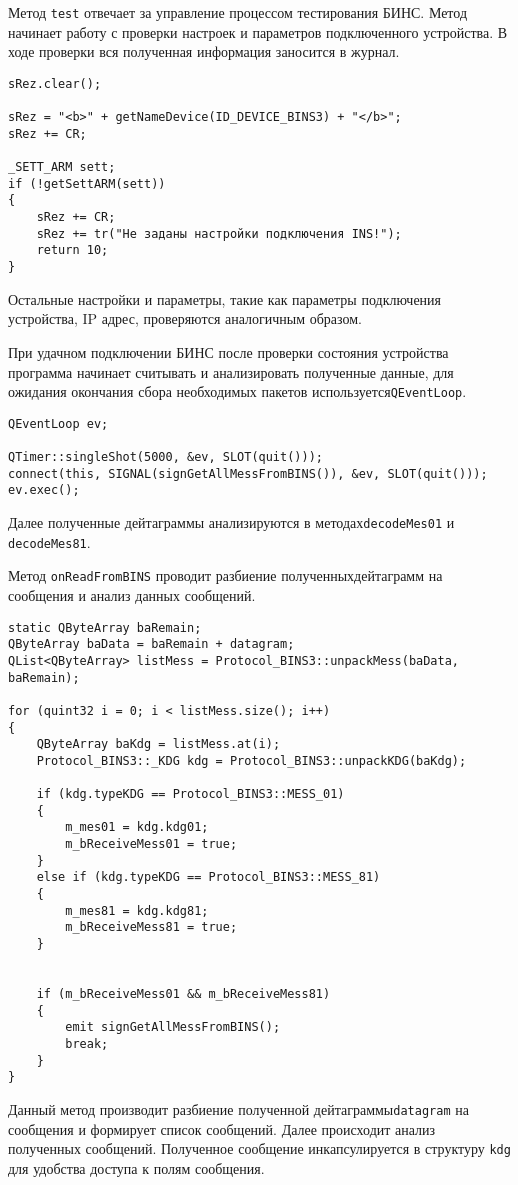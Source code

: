 Метод \texttt{test} отвечает за управление процессом тестирования БИНС. Метод начинает работу с проверки настроек и
параметров подключенного устройства. В ходе проверки вся полученная информация заносится в журнал.
\medskip
\begin{verbatim}
sRez.clear();

sRez = "<b>" + getNameDevice(ID_DEVICE_BINS3) + "</b>";
sRez += CR;

_SETT_ARM sett;
if (!getSettARM(sett))
{
	sRez += CR;
	sRez += tr("Не заданы настройки подключения INS!");
	return 10;
}
\end{verbatim}
\medskip

Остальные настройки и параметры, такие как параметры подключения устройства, IP адрес, проверяются аналогичным образом.

При удачном подключении БИНС после проверки состояния устройства программа начинает считывать и анализировать полученные
данные, для ожидания окончания сбора необходимых пакетов используется\break \texttt{QEventLoop}.
\medskip
\begin{verbatim}
QEventLoop ev;

QTimer::singleShot(5000, &ev, SLOT(quit()));
connect(this, SIGNAL(signGetAllMessFromBINS()), &ev, SLOT(quit()));
ev.exec();
\end{verbatim}
\medskip

Далее полученные дейтаграммы анализируются в методах\break \texttt{decodeMes01} и \texttt{decodeMes81}.

Метод \texttt{onReadFromBINS} проводит разбиение полученных\break дейтаграмм на сообщения и анализ данных сообщений.
\medskip
\begin{verbatim}
static QByteArray baRemain;
QByteArray baData = baRemain + datagram;
QList<QByteArray> listMess = Protocol_BINS3::unpackMess(baData, baRemain);

for (quint32 i = 0; i < listMess.size(); i++)
{
	QByteArray baKdg = listMess.at(i);
	Protocol_BINS3::_KDG kdg = Protocol_BINS3::unpackKDG(baKdg);

	if (kdg.typeKDG == Protocol_BINS3::MESS_01)
	{
		m_mes01 = kdg.kdg01;
		m_bReceiveMess01 = true;
	}
	else if (kdg.typeKDG == Protocol_BINS3::MESS_81)
	{
		m_mes81 = kdg.kdg81;
		m_bReceiveMess81 = true;
	}


	if (m_bReceiveMess01 && m_bReceiveMess81)
	{
		emit signGetAllMessFromBINS();
		break;
	}
}
\end{verbatim}
\medskip

Данный метод производит разбиение полученной дейтаграммы\break \texttt{datagram} на сообщения и формирует список сообщений.
Далее происходит анализ полученных сообщений. Полученное сообщение инкапсулируется в структуру \texttt{kdg} для удобства
доступа к полям сообщения.

